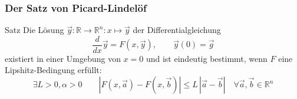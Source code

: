 %
%
%
\begin{frame}
\frametitle{Der Satz von Picard-Lindelöf}
\begin{block}{Satz}
Die Lösung $\vec{y}\colon \mathbb R\to\mathbb R^n: x\mapsto\vec{y}$ der
Differentialgleichung 
\[
\frac{d}{dx} \vec{y} = F(x,\vec{y}),
\qquad
\vec{y}(0)=\vec{g}
\]
existiert in einer Umgebung von $x=0$ und
ist eindeutig bestimmt, wenn $F$ eine Lipshitz-Bedingung erfüllt:
\[
\exists L>0, \alpha>0\qquad
|F(x, \vec{a}) - F(x,\vec{b})|
\le L \,|\vec{a} - \vec{b}|
\quad
\forall \vec{a},\vec{b}\in \mathbb R^n
\]
\end{block}
\end{frame}
